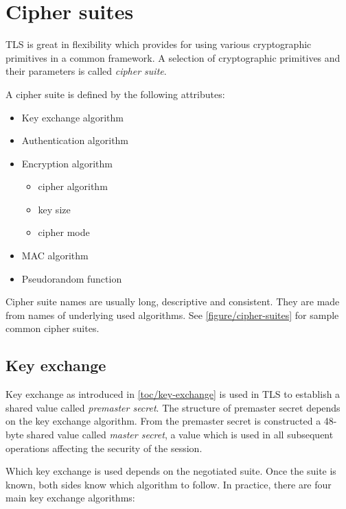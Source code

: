\section{Cipher suites}

TLS is great in flexibility which provides for using various cryptographic primitives in a common framework. A selection of cryptographic primitives and their parameters is called \textit{cipher suite}.

A cipher suite is defined by the following attributes:

\begin{itemize}
  \item Key exchange algorithm
  \item Authentication algorithm
  \item Encryption algorithm
  \begin{itemize}
    \item cipher algorithm
    \item key size
    \item cipher mode
  \end{itemize}
  \item MAC algorithm
  \item Pseudorandom function
\end{itemize}

Cipher suite names are usually long, descriptive and consistent. They are made from names of underlying used algorithms. See \autoref{figure/cipher-suites} for sample common cipher suites.

\subsection{Key exchange}

Key exchange as introduced in \autoref{toc/key-exchange} is used in TLS to establish a shared value called \textit{premaster secret}. The structure of premaster secret depends on the key exchange algorithm. From the premaster secret is constructed a 48-byte shared value called \textit{master secret}, a value which is used in all subsequent operations affecting the security of the session.

Which key exchange is used depends on the negotiated suite. Once the suite is known, both sides know which algorithm to follow. In practice, there are four main key exchange algorithms:

